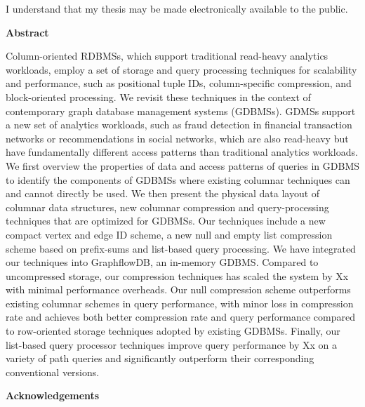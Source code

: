 \bigskip
  
\noindent
I understand that my thesis may be made electronically available to the public.

\cleardoublepage


\begin{center}\textbf{Abstract}\end{center}

Column-oriented RDBMSs, which support traditional read-heavy analytics workloads, employ a set of storage and query processing techniques for scalability and performance, such as positional tuple IDs, column-specific compression, and block-oriented processing. We revisit these techniques in the context of contemporary graph database management systems (GDBMSs). GDMSs support a new set of analytics workloads, such as fraud detection in financial transaction networks or recommendations in social networks, which are also read-heavy but have fundamentally different access patterns than traditional analytics workloads. We first overview the properties of data and access patterns of queries in GDBMS to identify the components of GDBMSs where existing columnar techniques can and cannot directly be used. We then present the physical data layout of columnar data structures, new columnar compression and query-processing techniques that are optimized for GDBMSs. Our techniques include a new compact vertex and edge ID scheme, a new null and empty list compression scheme based on prefix-sums and list-based query processing. We have integrated our techniques into GraphflowDB, an in-memory GDBMS. Compared to uncompressed storage, our compression techniques has scaled the system by Xx with minimal performance overheads. Our null compression scheme outperforms existing columnar schemes in query performance, with minor loss in compression rate and achieves both better compression rate and query performance compared to row-oriented storage techniques adopted by existing GDBMSs. Finally, our list-based query processor techniques improve query performance by Xx on a variety of path queries and significantly outperform their corresponding conventional versions.

\cleardoublepage


\begin{center}\textbf{Acknowledgements}\end{center}

